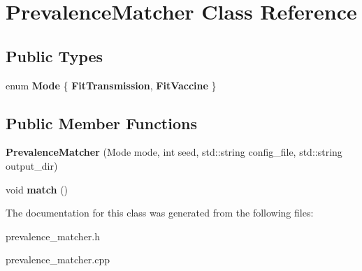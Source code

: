 \hypertarget{class_prevalence_matcher}{}\section{Prevalence\+Matcher Class Reference}
\label{class_prevalence_matcher}
\subsection*{Public Types}
\begin{DoxyCompactItemize}
\item 
\mbox{\label{class_prevalence_matcher_a88137e22062bcbcc299bbdd3894e9106}} 
enum {\bfseries Mode} \{ {\bfseries Fit\+Transmission}, 
{\bfseries Fit\+Vaccine}
 \}
\end{DoxyCompactItemize}
\subsection*{Public Member Functions}
\begin{DoxyCompactItemize}
\item 
\mbox{\label{class_prevalence_matcher_a1bc1c20b6f581ac1f174de7bccfc0830}} 
{\bfseries Prevalence\+Matcher} (Mode mode, int seed, std\+::string config\+\_\+file, std\+::string output\+\_\+dir)
\item 
\mbox{\label{class_prevalence_matcher_a324a3a6a5d098a15c0011f1a4e22c35f}} 
void {\bfseries match} ()
\end{DoxyCompactItemize}


The documentation for this class was generated from the following files\+:\begin{DoxyCompactItemize}
\item 
prevalence\+\_\+matcher.\+h\item 
prevalence\+\_\+matcher.\+cpp\end{DoxyCompactItemize}
